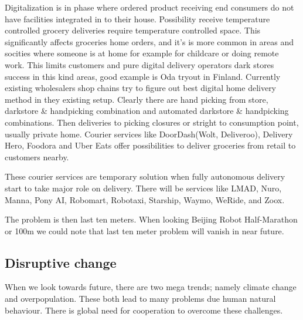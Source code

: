 Digitalization is in phase where ordered product receiving end consumers do
not have facilities integrated in to their house. Possibility receive
temperature controlled grocery deliveries require temperature controlled
space. This significantly affects groceries home orders, and it's is more
common in areas and socities where someone is at home for example for
childcare or doing remote work. This limits customers and pure digital
delivery operators dark stores success in this kind areas, good example is
Oda\allowbreak\cite{Oda} tryout in Finland. Currently existing wholesalers
shop chains try to figure out best digital home delivery method in they
existing setup. Clearly there are hand picking from store, darkstore \&
handpicking combination and automated darkstore \& handpicking combinations.
Then deliveries to picking closures or stright to consumption point, usually
private home. Courier services like DoorDash\allowbreak\cite{
DoorDash}\allowbreak(Wolt\allowbreak\cite{Wolt}, Deliveroo\allowbreak\cite{
Deliveroo}), Delivery Hero\allowbreak\cite{
DeliveryHero}\allowbreak, Foodora\allowbreak\cite{Foodora} and Uber
Eats\allowbreak\cite{UberEats} offer possibilities to deliver groceries
from retail to customers nearby.

These courier services are temporary solution when fully autonomous delivery
start to take major role on delivery. There will be services like
LMAD\allowbreak\cite{LMAD},
Nuro\allowbreak\cite{Nuro},
Manna\allowbreak\cite{Manna},
Pony AI\allowbreak\cite{PonyAI},
Robomart\allowbreak\cite{Robomart},
Robotaxi\allowbreak\cite{Robotaxi},
Starship\allowbreak\cite{StarShip},
Waymo\allowbreak\cite{Waymo},
WeRide\allowbreak\cite{WeRideAI},
and
Zoox\allowbreak\cite{Zoox}.

The problem is then last ten meters. When looking Beijing Robot
Half-Marathon\allowbreak\cite{RobotHalfMarathon} or
100m\allowbreak\cite{Robot100m} we could note that
last ten meter problem will vanish in near future.

\subsection{Disruptive change}\label{disruptive change}

When we look towards future, there are two mega trends; namely climate change 
and overpopulation. These both lead to many problems due human natural
behaviour. There is global need for cooperation to overcome these challenges.

